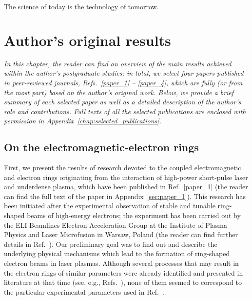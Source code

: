 \documentclass[10pt, a4paper, twoside, openright]{report}
\begin{document}
%


\begin{savequote}[0.45\linewidth]
	\begin{fquote}
		 The science of today is the technology of tomorrow.
	\end{fquote}
\end{savequote}

\chapter{Author's original results\label{chap:authors_original_results}}
%

\textsl{In this chapter, the reader can find an overview of the main results achieved within the author's postgraduate studies; in total, we select four papers published in peer-reviewed journals, Refs.~\ref{paper_1} -- \ref{paper_4}, which are fully (or from the most part) based on the author's original work. Below, we provide a brief summary of each selected paper as well as a detailed description of the author's role and contributions. Full texts of all the selected publications are enclosed with permission in Appendix~\ref{chap:selected_publications}.}

\section{On the electromagnetic-electron rings\label{sec:on_the_electromagnetic-electron_rings}}
%

First, we present the results of research devoted to the coupled electromagnetic and electron rings originating from the interaction of high-power short-pulse laser and underdense plasma, which have been published in Ref.~\ref{paper_1} (the reader can find the full text of the paper in Appendix~\ref{sec:paper_1}). This research has been initiated after the experimental observation of stable and tunable ring-shaped beams of high-energy electrons; the experiment has been carried out by the ELI Beamlines Electron Acceleration Group at the Institute of Plasma Physics and Laser Microfusion in Warsaw, Poland (the reader can find further details in Ref.~). Our preliminary goal was to find out and describe the underlying physical mechanisms which lead to the formation of ring-shaped electron beams in laser plasmas. Although several processes that may result in the electron rings of similar parameters were already identified and presented in literature at that time (see, e.g., Refs.~), none of them seemed to correspond to the particular experimental parameters used in Ref.~.
\end{document}
